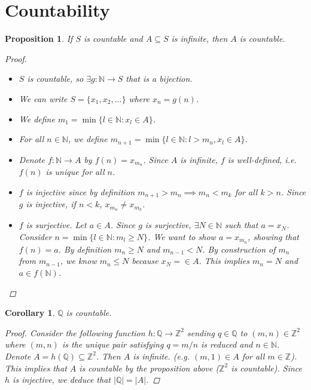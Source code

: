 \documentclass[10pt]{article}
\newcommand{\N}{\mathbb{N}}
\newcommand{\Z}{\mathbb{Z}}
\newcommand{\Q}{\mathbb{Q}}
\newcommand{\abs}[1]{\left| #1 \right|}
\newtheorem{corollary}[theorem]{Corollary}
\newtheorem{proposition}[theorem]{Proposition}
\theoremstyle{definition}
\theoremstyle{remark}
\begin{document}
\newpage

\section{Countability}

\begin{proposition}
    If $S$ is countable and $A \subseteq S$ is infinite, then $A$ is countable.
    \begin{proof}
        \hfill
        \begin{itemize}
            \item
        $S$ is countable, so $\exists g: \N \to S$ that is a bijection.
            \item
        We can write $S = \{x_1, x_2, \ldots\}$ where $x_n = g(n)$.
            \item
        We define $m_1 = \min\{l \in \N : x_l \in A\}$.
            \item
        For all $n \in \N$, we define $m_{n+1} = \min\{l \in \N : l > m_n, x_l \in A\}$.
            \item
        Denote $f: \N \to A$ by $f(n) = x_{m_n}$. Since $A$ is infinite, $f$ is well-defined, i.e. $f(n)$ is unique for all $n$.
        \end{itemize}
        \begin{itemize}
            \item $f$ is injective since by definition $m_{n+1} > m_n \implies m_n < m_k$ for all $k > n$.
                Since $g$ is injective, if $n < k$, $x_{m_n} \neq x_{m_k}$.
            \item $f$ is surjective. Let $a \in A$.
                Since $g$ is surjective, $\exists N \in \N$ such that $a = x_N$.
                Consider $n = \min \{l \in \N : m_l \geq N\}$. 
                We want to show $a = x_{m_n}$, showing that $f(n) = a$.
                By definition $m_n \geq N$ and $m_{n-1} < N$.
                By construction of $m_n$ from $m_{n-1}$, we know $m_n \leq N$ because $x_N = \in A$.
                This implies $m_n = N$ and $a \in f(\N)$.
        \end{itemize}
    \end{proof}
\end{proposition}

\begin{corollary}
    $\Q$ is countable.
    \begin{proof}
        Consider the following function $h : \Q \to \Z^2$ sending $q \in \Q$ to $(m, n) \in \Z^2$ where $(m, n)$ is the unique pair satisfying $q = m/n$ is reduced and $n \in \N$.
        Denote $A = h(\Q) \subseteq \Z^2$. Then $A$ is infinite. (e.g. $(m, 1) \in A$ for all $m \in \Z$).
        This implies that $A$ is countable by the proposition above ($\Z^2$ is countable).
        Since $h$ is injective, we deduce that $\abs{\Q} = \abs{A}$.
    \end{proof}
\end{corollary}
\end{document}
